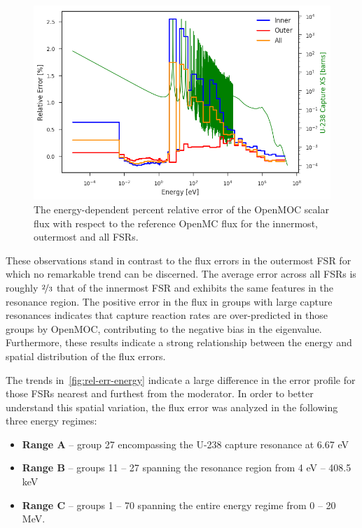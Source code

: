 \begin{figure}[h!]
\centering
\includegraphics[width=\linewidth]{figures/rel-err-inner-outer}
\caption{The energy-dependent percent relative error of the OpenMOC scalar flux with respect to the reference OpenMC flux for the innermost, outermost and all FSRs.}
\label{fig:rel-err-energy}
\end{figure}

These observations stand in contrast to the flux errors in the outermost FSR for which no remarkable trend can be discerned. The average error across all FSRs is roughly $\nicefrac{2}{3}$ that of the innermost FSR and exhibits the same features in the resonance region. The positive error in the flux in groups with large capture resonances indicates that capture reaction rates are over-predicted in those groups by OpenMOC, contributing to the negative bias in the eigenvalue. Furthermore, these results indicate a strong relationship between the energy and spatial distribution of the flux errors.

The trends in~\autoref{fig:rel-err-energy} indicate a large difference in the error profile for those FSRs nearest and furthest from the moderator. In order to better understand this spatial variation, the flux error was analyzed in the following three energy regimes:

\begin{itemize}
  \item {\bf Range A} -- group 27 encompassing the U-238 capture resonance at 6.67 eV
  \item {\bf Range B} -- groups 11 -- 27 spanning the resonance region from 4 eV -- 408.5 keV
  \item {\bf Range C} -- groups 1 -- 70 spanning the entire energy regime from 0 -- 20 MeV.
\end{itemize}

